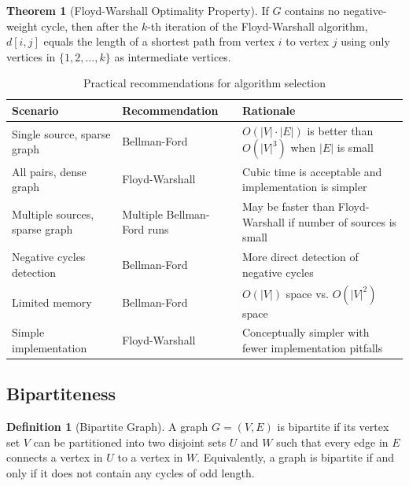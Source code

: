 \documentclass{article}
\theoremstyle{definition}
\newtheorem{theorem}{Theorem}
\newtheorem{definition}{Definition}
\begin{document}
\begin{theorem}[Floyd-Warshall Optimality Property]
If $G$ contains no negative-weight cycle, then after the $k$-th iteration of the Floyd-Warshall algorithm, $d[i,j]$ equals the length of a shortest path from vertex $i$ to vertex $j$ using only vertices in $\{1, 2, \ldots, k\}$ as intermediate vertices.
\end{theorem}

\begin{table}[h]
\centering
\begin{tabular}{|p{3cm}|p{5.5cm}|p{5.5cm}|}
\hline
\textbf{Scenario} & \textbf{Recommendation} & \textbf{Rationale} \\
\hline
Single source, sparse graph & Bellman-Ford & $O(|V| \cdot |E|)$ is better than $O(|V|^3)$ when $|E|$ is small \\
\hline
All pairs, dense graph & Floyd-Warshall & Cubic time is acceptable and implementation is simpler \\
\hline
Multiple sources, sparse graph & Multiple Bellman-Ford runs & May be faster than Floyd-Warshall if number of sources is small \\
\hline
Negative cycles detection & Bellman-Ford & More direct detection of negative cycles \\
\hline
Limited memory & Bellman-Ford & $O(|V|)$ space vs. $O(|V|^2)$ space \\
\hline
Simple implementation & Floyd-Warshall & Conceptually simpler with fewer implementation pitfalls \\
\hline
\end{tabular}
\caption{Practical recommendations for algorithm selection}
\end{table}

\pagebreak
\newpage


\subsection{Bipartiteness}\label{subsec:bipartiteness}

\begin{definition}[Bipartite Graph]
A graph $G = (V, E)$ is bipartite if its vertex set $V$ can be partitioned into two disjoint sets $U$ and $W$ such that every edge in $E$ connects a vertex in $U$ to a vertex in $W$. Equivalently, a graph is bipartite if and only if it does not contain any cycles of odd length.
\end{definition}
\end{document}
